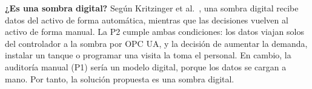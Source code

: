 \textbf{¿Es una sombra digital?} Según Kritzinger et al.~\cite{kritzinger2018}, una sombra digital recibe datos del activo de forma automática, mientras que las decisiones vuelven al activo de forma manual. La P2 cumple ambas condiciones: los datos viajan solos del controlador a la sombra por OPC UA, y la decisión de aumentar la demanda, instalar un tanque o programar una visita la toma el personal. En cambio, la auditoría manual (P1) sería un modelo digital, porque los datos se cargan a mano. Por tanto, la solución propuesta es una sombra digital.
